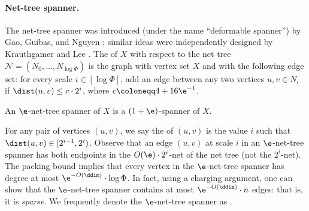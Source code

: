 \paragraph{Net-tree spanner.}
The net-tree spanner was introduced (under the name ``deformable spanner'') by Gao, Guibas, and Nguyen \cite{gao2004deformable}; similar ideas were independently designed by Krauthgamer and Lee \cite{KL04}.  The  of $X$ with respect to the net tree $\mathcal{N} = (N_0, \ldots, N_{\log \Phi})$ is the graph with vertex set $X$ and with the following edge set: for every scale $i \in [\log \Phi]$, add an edge between any two vertices $u, v \in N_i$ if $\dist(u, v) \le c \cdot 2^i$, where $c \coloneqq 4 + 16 \e^{-1}$.
\begin{lemma}
\label{lem:net-spanner}
    An $\e$-net-tree spanner of $X$ is a $(1+\e)$-spanner of $X$.
\end{lemma}
For any pair of vertices $(u, v)$, we say the  of $(u, v)$ is the value $i$ such that $\dist(u, v) \in [2^{i-1}, 2^i)$. Observe that an edge $(u,v)$ at scale $i$ in an $\e$-net-tree spanner has both endpoints in the $O(\e) \cdot 2^i$-net of the net tree
(not the $2^i$-net). The packing bound implies that every vertex in the $\e$-net-tree spanner has degree at most $\e^{-O(\ddim)} \cdot \log \Phi$.
In fact, using a charging argument,
one can show that the $\e$-net-tree spanner contains at most $\e^{-O(\ddim)} \cdot n$ edges: that is, it is \emph{sparse}.
We frequently denote the $\e$-net-tree spanner as .
%
%
